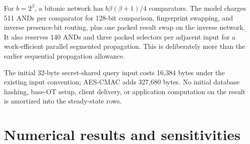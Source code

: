 \documentclass[11pt]{article}
\begin{document}
For $b=2^\beta$, a bitonic network has
$b\beta(\beta+1)/4$ comparators. The model charges 511 ANDs per comparator
for 128-bit comparison, fingerprint swapping, and inverse presence-bit
routing, plus one packed result swap on the inverse network. It also
reserves 140 ANDs and three packed selectors per adjacent input for a
work-efficient parallel segmented propagation. This is deliberately more
than the earlier sequential propagation allowance.

The initial 32-byte secret-shared query input costs 16,384 bytes under
the existing input convention; AES-CMAC adds 327,680 bytes. No initial
database hashing, base-OT setup, client delivery, or application computation
on the result is amortized into the steady-state rows.

\section{Numerical results and sensitivities}\label{sec:results}
\end{document}
